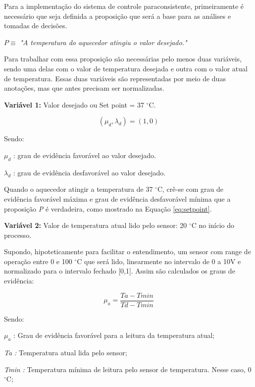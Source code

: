 Para a implementação do sistema de controle paraconsistente, primeiramente é necessário que seja definida a proposição que será a base para as análises e tomadas de decisões.

\begin{center}
$ P \equiv $ 
\emph{"A temperatura do aquecedor atingiu o valor desejado."}
\end{center}

Para trabalhar com essa proposição são necessárias pelo menos duas variáveis, sendo uma delas com o valor de temperatura desejada e outra com o valor atual de temperatura. Essas duas variáveis são representadas por meio de duas anotações, mas que antes precisam ser normalizadas. 

\textbf{Variável 1:} 
Valor desejado ou Set point = 37 $^{\circ}$C. 

\begin{equation}
( \mu _{d}, \lambda _{d} ) = (1,0)
\label{eq:setpoint}
\end{equation}

Sendo:

$\mu _{d}$ : grau de evidência favorável ao valor desejado. 

$\lambda _{d}$ : grau de evidência desfavorável ao valor desejado.

Quando o aquecedor atingir a temperatura de 37 $^{\circ}$C, 
crê-se com grau de evidência favorável máxima e grau de evidência desfavorável mínima que a proposição \emph{P} é verdadeira, como mostrado na Equação \ref{eq:setpoint}.



\textbf{Variável 2:} 
Valor de temperatura atual lido pelo sensor: 20 $^{\circ}$C no início do processo.

Supondo, hipoteticamente para facilitar o entendimento, um sensor com range de operação entre 0 e 100 $^{\circ}$C que será lido, linearmente no intervalo de 0 a 10V e normalizado para o intervalo fechado [0,1]. Assim são calculados os graus de evidência:

\begin{equation}
\mu _{a} = 
\frac{Ta - Tmin}{Td - Tmin}
\label{eq:miatual}
\end{equation}

Sendo:

$\mu _{a}$ : Grau de evidência favorável para a leitura da temperatura atual;

\emph{Ta :} Temperatura atual lida pelo sensor;

\emph{Tmin :} Temperatura mínima de leitura pelo sensor de temperatura. Nesse caso, 0 $^{\circ}$C;

